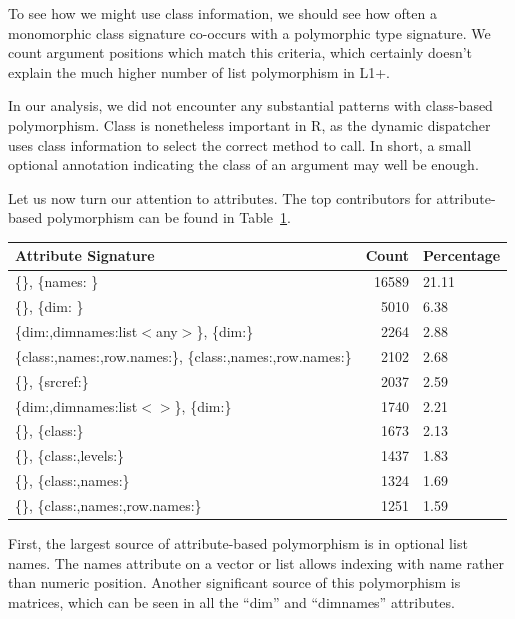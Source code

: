 \documentclass[acmsmall,10pt,review,anonymous]{acmart}\settopmatter{printfolios=true,printccs=false,printacmref=false}
\begin{document}
To see how we might use class information, we should see how often a monomorphic class signature co-occurs with a polymorphic type signature.
We count \NUMPOLYTYPEMONOCLASS argument positions which match this criteria, which certainly doesn't explain the much higher number of list polymorphism in L1+.

In our analysis, we did not encounter any substantial patterns with class-based polymorphism.
Class is nonetheless important in R, as the dynamic dispatcher uses class information to select the correct method to call.
In short, a small optional annotation indicating the class of an argument may well be enough.

Let us now turn our attention to attributes.
The top contributors for attribute-based polymorphism can be found in Table~\ref{tab:topattrpoly}.

\begin{table}[ht]
\label{tab:topattrpoly}
\centering
\begin{tabular}{lrl}
  \hline
Attribute Signature & Count & Percentage \\
  \hline
\{\}, \{names: \C\} & 16589 & 21.11 \\
  \{\}, \{dim: \I\} & 5010 & 6.38 \\
  \{dim:\I,dimnames:list$<$any$>$\}, \{dim:\I\} & 2264 & 2.88 \\
  \{class:\C,names:\C,row.names:\C\}, \{class:\C,names:\C,row.names:\I\} & 2102 & 2.68 \\
  \{\}, \{srcref:\I\} & 2037 & 2.59 \\
  \{dim:\I,dimnames:list$<$\C$>$\}, \{dim:\I\} & 1740 & 2.21 \\
  \{\}, \{class:\C\} & 1673 & 2.13 \\
  \{\}, \{class:\C,levels:\C\} & 1437 & 1.83 \\
  \{\}, \{class:\C,names:\C\} & 1324 & 1.69 \\
  \{\}, \{class:\C,names:\C,row.names:\I\} & 1251 & 1.59 \\
   \hline
\end{tabular}
\end{table}

First, the largest source of attribute-based polymorphism is in optional list names.
The names attribute on a vector or list allows indexing with name rather than numeric position.
Another significant source of this polymorphism is matrices, which can be seen in all the ``dim'' and ``dimnames'' attributes.
\end{document}
